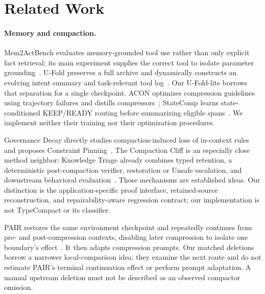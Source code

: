 \documentclass[10pt,twocolumn,letterpaper]{article}
\begin{document}
\section{Related Work}
\paragraph{Memory and compaction.}
Mem2ActBench evaluates memory-grounded tool use rather than only explicit fact
retrieval; its main experiment supplies the correct tool to isolate parameter
grounding~\cite{mem2act}. U-Fold preserves a full archive and dynamically
constructs an evolving intent summary and task-relevant tool log~\cite{ufold}.
Our U-Fold-lite borrows that separation for a single checkpoint. ACON optimizes
compression guidelines using trajectory failures and distills
compressors~\cite{acon}; StateComp learns state-conditioned KEEP/READY routing
before summarizing eligible spans~\cite{statecomp}. We implement neither their
training nor their optimization procedures.

Governance Decay directly studies compaction-induced loss of in-context rules
and proposes Constraint Pinning~\cite{governance}. The Compaction Cliff is an
especially close method neighbor: Knowledge Triage already combines typed
retention, a deterministic post-compaction verifier, restoration or Unsafe
escalation, and downstream behavioral evaluation~\cite{cliff}. Those mechanisms
are established ideas. Our distinction is the application-specific proof
interface, retained-source reconstruction, and repairability-aware regression
contract; our implementation is not TypeCompact or its classifier.

PAIR restores the same environment checkpoint and repeatedly continues from
pre- and post-compression contexts, disabling later compression to isolate one
boundary's effect~\cite{pair}. It then adapts compression prompts. Our matched
deletions borrow a narrower local-comparison idea: they examine the next route
and do not estimate PAIR's terminal continuation effect or perform prompt
adaptation. A manual upstream deletion must not be described as an observed
compactor omission.
\end{document}
